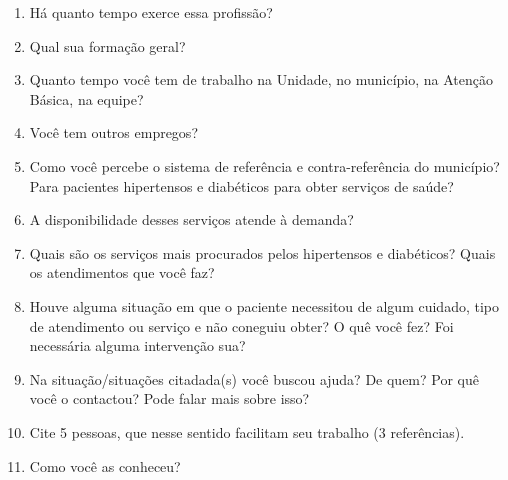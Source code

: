 \label{an:exemplo-de-anexo}

\begin{enumerate}
	\item Há quanto tempo exerce essa profissão?
	\item Qual sua formação geral?
	\item Quanto tempo você tem de trabalho na Unidade, no município, na Atenção Básica, na equipe?
	\item Você tem outros empregos?
	\item Como você percebe o sistema de referência e contra-referência do município? Para pacientes hipertensos e diabéticos para obter serviços de saúde?
	\item A disponibilidade desses serviços atende à demanda?
	\item Quais são os serviços mais procurados pelos hipertensos e diabéticos? Quais os atendimentos que você faz?
	\item Houve alguma situação em que o paciente necessitou de algum cuidado, tipo de atendimento ou serviço e não coneguiu obter? O quê você fez? Foi necessária alguma intervenção sua?
	\item Na situação/situações citadada(s) você buscou ajuda? De quem? Por quê você o contactou? Pode falar mais sobre isso?
	\item Cite 5 pessoas, que nesse sentido facilitam seu trabalho (3 referências).
	\item Como você as conheceu?
\end{enumerate}